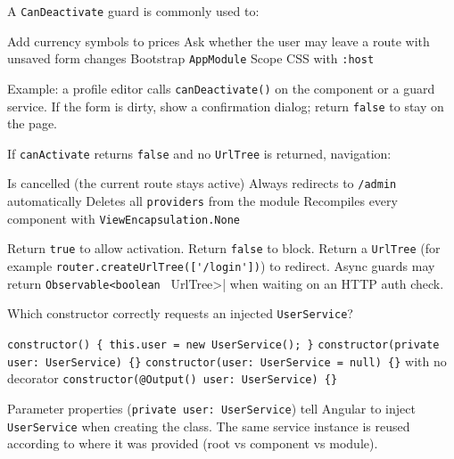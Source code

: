 \question[4]
A \lstinline[style=tsinline]|CanDeactivate| guard is commonly used to:
\begin{choices}
  \choice Add currency symbols to prices
  \CorrectChoice Ask whether the user may leave a route with unsaved form changes
  \choice Bootstrap \texttt{AppModule}
  \choice Scope CSS with \lstinline[style=htmlinline]|:host|
\end{choices}
\begin{solution}
  Example: a profile editor calls \lstinline[style=tsinline]|canDeactivate()| on the component or a guard service. If the form is dirty, show a confirmation dialog; return \texttt{false} to stay on the page.
\end{solution}

\question[4]
If \lstinline[style=tsinline]|canActivate| returns \texttt{false} and no \lstinline[style=tsinline]|UrlTree| is returned, navigation:
\begin{choices}
  \CorrectChoice Is cancelled (the current route stays active)
  \choice Always redirects to \texttt{/admin} automatically
  \choice Deletes all \texttt{providers} from the module
  \choice Recompiles every component with \texttt{ViewEncapsulation.None}
\end{choices}
\begin{solution}
  Return \texttt{true} to allow activation. Return \texttt{false} to block. Return a \lstinline[style=tsinline]|UrlTree| (for example \lstinline[style=tsinline]|router.createUrlTree(['/login'])|) to redirect. Async guards may return \lstinline[style=tsinline]|Observable<boolean | UrlTree>| when waiting on an HTTP auth check.
\end{solution}

\question[4]
Which constructor correctly requests an injected \texttt{UserService}?
\begin{choices}
  \choice \lstinline[style=tsinline]|constructor() { this.user = new UserService(); }|
  \CorrectChoice \lstinline[style=tsinline]|constructor(private user: UserService) {}|
  \choice \lstinline[style=tsinline]|constructor(user: UserService = null) {}| with no decorator
  \choice \lstinline[style=tsinline]|constructor(@Output() user: UserService) {}|
\end{choices}
\begin{solution}
  Parameter properties (\lstinline[style=tsinline]|private user: UserService|) tell Angular to inject \texttt{UserService} when creating the class. The same service instance is reused according to where it was provided (root vs component vs module).
\end{solution}

